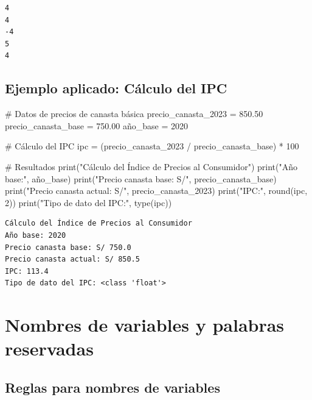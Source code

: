 \documentclass[
  doc,
  floatsintext,
  longtable,
  a4paper,
  nolmodern,
  notxfonts,
  notimes,
  12pt,
  colorlinks=true,linkcolor=blue,citecolor=blue,urlcolor=blue]{apa7}
\newenvironment{Shaded}{\begin{snugshade}}{\end{snugshade}}
\newcommand{\BuiltInTok}[1]{\textcolor[rgb]{0.00,0.23,0.31}{#1}}
\newcommand{\CommentTok}[1]{\textcolor[rgb]{0.37,0.37,0.37}{#1}}
\newcommand{\DecValTok}[1]{\textcolor[rgb]{0.68,0.00,0.00}{#1}}
\newcommand{\FloatTok}[1]{\textcolor[rgb]{0.68,0.00,0.00}{#1}}
\newcommand{\NormalTok}[1]{\textcolor[rgb]{0.00,0.23,0.31}{#1}}
\newcommand{\OperatorTok}[1]{\textcolor[rgb]{0.37,0.37,0.37}{#1}}
\newcommand{\StringTok}[1]{\textcolor[rgb]{0.13,0.47,0.30}{#1}}
\begin{document}
\begin{verbatim}
4
4
-4
5
4
\end{verbatim}

\subsection{Ejemplo aplicado: Cálculo del
IPC}\label{ejemplo-aplicado-cuxe1lculo-del-ipc}

\begin{Shaded}
\begin{Highlighting}[]
\CommentTok{\# Datos de precios de canasta básica}
\NormalTok{precio\_canasta\_2023 }\OperatorTok{=} \FloatTok{850.50}
\NormalTok{precio\_canasta\_base }\OperatorTok{=} \FloatTok{750.00}
\NormalTok{año\_base }\OperatorTok{=} \DecValTok{2020}

\CommentTok{\# Cálculo del IPC}
\NormalTok{ipc }\OperatorTok{=}\NormalTok{ (precio\_canasta\_2023 }\OperatorTok{/}\NormalTok{ precio\_canasta\_base) }\OperatorTok{*} \DecValTok{100}

\CommentTok{\# Resultados}
\BuiltInTok{print}\NormalTok{(}\StringTok{"Cálculo del Índice de Precios al Consumidor"}\NormalTok{)}
\BuiltInTok{print}\NormalTok{(}\StringTok{"Año base:"}\NormalTok{, año\_base)}
\BuiltInTok{print}\NormalTok{(}\StringTok{"Precio canasta base: S/"}\NormalTok{, precio\_canasta\_base)}
\BuiltInTok{print}\NormalTok{(}\StringTok{"Precio canasta actual: S/"}\NormalTok{, precio\_canasta\_2023)}
\BuiltInTok{print}\NormalTok{(}\StringTok{"IPC:"}\NormalTok{, }\BuiltInTok{round}\NormalTok{(ipc, }\DecValTok{2}\NormalTok{))}
\BuiltInTok{print}\NormalTok{(}\StringTok{"Tipo de dato del IPC:"}\NormalTok{, }\BuiltInTok{type}\NormalTok{(ipc))}
\end{Highlighting}
\end{Shaded}

\begin{verbatim}
Cálculo del Índice de Precios al Consumidor
Año base: 2020
Precio canasta base: S/ 750.0
Precio canasta actual: S/ 850.5
IPC: 113.4
Tipo de dato del IPC: <class 'float'>
\end{verbatim}

\section{Nombres de variables y palabras
reservadas}\label{nombres-de-variables-y-palabras-reservadas}

\subsection{Reglas para nombres de
variables}\label{reglas-para-nombres-de-variables}
\end{document}
